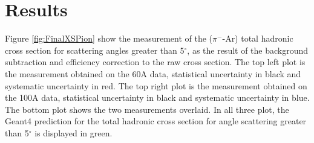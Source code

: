 \section{Results}\label{ch:FinalPion}
Figure \ref{fig:FinalXSPion} show the measurement of the ($\pi^-$-Ar) total hadronic cross section for  scattering angles greater than 5$^\circ$, as the result of the background subtraction and efficiency correction to the raw cross section. The top left plot is the measurement obtained on the 60A data, statistical uncertainty in black and systematic uncertainty in red. The top right plot is the measurement obtained on the 100A data, statistical uncertainty in black and systematic uncertainty in blue. The bottom plot shows the two measurements overlaid. In all three plot, the Geant4 prediction for the total hadronic cross section for angle scattering greater than 5$^\circ$ is displayed in green.

